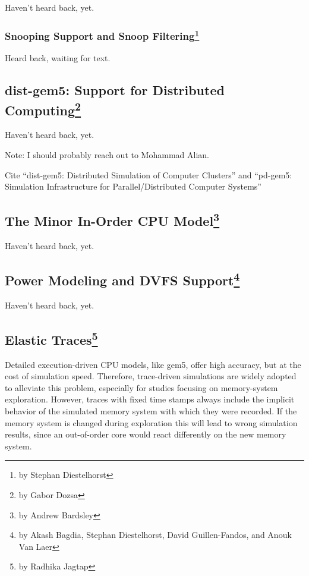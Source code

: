 Haven't heard back, yet.

\subsubsection[Snooping Support and Snoop Filtering]{Snooping Support and Snoop Filtering\footnote{by Stephan Diestelhorst}}

Heard back, waiting for text.

\subsection[dist-gem5: Support for Distributed Computing]{dist-gem5: Support for Distributed Computing\footnote{by Gabor Dozsa}}

Haven't heard back, yet.

Note: I should probably reach out to Mohammad Alian.

Cite ``dist-gem5: Distributed Simulation of Computer Clusters'' and ``pd-gem5: Simulation Infrastructure for Parallel/Distributed Computer Systems''

\subsection[The Minor In-Order CPU Model]{The Minor In-Order CPU Model\footnote{by Andrew Bardsley}}

Haven't heard back, yet.

\subsection[Power Modeling and DVFS Support]{Power Modeling and DVFS Support\footnote{by Akash Bagdia, Stephan Diestelhorst, David Guillen-Fandos, and Anouk Van Laer}}

Haven't heard back, yet.

\subsection[Elastic Traces]{Elastic Traces\footnote{by Radhika Jagtap}}

Detailed execution-driven CPU models, like gem5, offer high accuracy, but at the cost of simulation speed.
Therefore, trace-driven simulations are widely adopted to alleviate this problem, especially for studies focusing on memory-system exploration.
However, traces with fixed time stamps always include the implicit behavior of the simulated memory system with which they were recorded.
If the memory system is changed during exploration this will lead to wrong simulation results, since an out-of-order core would react differently on the new memory system.

